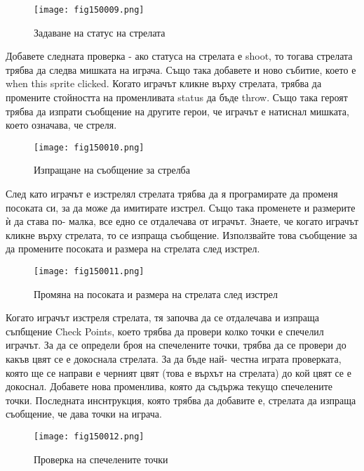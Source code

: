 \begin{figure}[H]
  \centering
  \texttt{[image: fig150009.png]}
  \caption{Задаване на статус на стрелата}
\label{fig150009}
\end{figure}

Добавете следната проверка - ако статуса на стрелата е shoot, то тогава стрелата трябва да следва мишката на играча. Също така добавете и ново събитие, което е when this sprite clicked. Когато играчът кликне върху стрелата, трябва да промените стойността на променливата status да бъде throw. Също така героят трябва да изпрати съобщение на другите герои, че играчът е натиснал мишката, което означава, че стреля.

\begin{figure}[H]
  \centering
  \texttt{[image: fig150010.png]}
  \caption{Изпращане на съобщение за стрелба}
\label{fig150010}
\end{figure}

След като играчът е изстрелял стрелата трябва да я програмирате да променя посоката си, за да може да имитирате изстрел. Също така променете и размерите ѝ да става по- малка, все едно се отдалечава от играчът. Знаете, че когато играчът кликне върху стрелата, то се изпраща съобщение. Използвайте това съобщение за да промените посоката и размера на стрелата след изстрел.

\begin{figure}[H]
  \centering
  \texttt{[image: fig150011.png]}
  \caption{Промяна на посоката и размера на стрелата след изстрел}
\label{fig150011}
\end{figure}

Когато играчът изстреля стрелата, тя започва да се отдалечава и изпраща съпбщение Check Points, което трябва да провери колко точки е спечелил играчът. За да се определи броя на спечелените точки, трябва да се провери до какъв цвят се е докоснала стрелата. За да бъде най- честна играта проверката, която ще се направи е черният цвят (това е върхът на стрелата) до кой цвят се е докоснал. Добавете нова променлива, която да съдържа текущо спечелените точки. Последната инснтрукция, която трябва да добавите е, стрелата да изпраща съобщение, че дава точки на играча.

\begin{figure}[H]
  \centering
  \texttt{[image: fig150012.png]}
  \caption{Проверка на спечелените точки}
\label{fig150012}
\end{figure}

